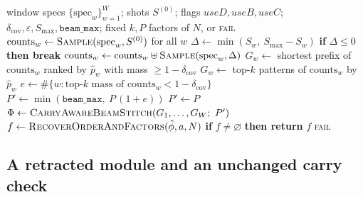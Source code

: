 \documentclass[final,5p,times,longtitle]{elsarticle}
\newenvironment{widealgorithm}{\begin{algorithm*}}{\end{algorithm*}}
\newenvironment{widealgorithm}{\begin{algorithm}[htbp]}{\end{algorithm}}
\newcommand{\Cw}{C_w}
\newcommand{\dcov}{\delta_{\mathrm{cov}}}
\newcommand{\Smax}{S_{\max}}
\newcommand{\beammax}{\texttt{beam\_max}}
\begin{document}
\begin{widealgorithm}
\caption{Confidence-guided adaptive reconstruction. Inputs are the
window specifications, the sampling configuration, the three module
flags, and the parameters of Table~\ref{tab:params}. Lines marked
\textbf{[D]}, \textbf{[B]} and \textbf{[C]} are the only departures from
the published pipeline.}
\label{alg:adaptive}
\small
\begin{algorithmic}[1]
\Require window specs $\{\mathrm{spec}_w\}_{w=1}^{W}$; shots $S^{(0)}$;
flags $\textit{useD},\textit{useB},\textit{useC}$; $\dcov,\varepsilon,\Smax,\beammax$; fixed $k,P$
\Ensure factors of $N$, or \textsc{fail}
\State $\mathrm{counts}_w \gets \textsc{Sample}(\mathrm{spec}_w, S^{(0)})$ for all $w$
\Statex
{}
    \While{$\Cw(\mathrm{counts}_w) < 1-\varepsilon$}
      \State $\Delta \gets \min(S_w,\ \Smax - S_w)$
      \State \textbf{if} $\Delta \le 0$ \textbf{then break}
      \State $\mathrm{counts}_w \gets \mathrm{counts}_w \uplus \textsc{Sample}(\mathrm{spec}_w, \Delta)$
    \EndWhile
  \EndFor
\EndIf
\Statex
{}
    \State $G_w \gets$ shortest prefix of $\mathrm{counts}_w$ ranked by
           $\hat p_w$ with mass $\ge 1-\dcov$ 
  \Else
    \State $G_w \gets$ top-$k$ patterns of $\mathrm{counts}_w$ by $\hat p_w$
  \EndIf
\EndFor
\Statex
{}
  \State $e \gets \#\{w : \text{top-}k\text{ mass of } \mathrm{counts}_w < 1-\dcov\}$
  \State $P' \gets \min(\beammax,\ P\,(1+e))$
\Else
  \State $P' \gets P$
\EndIf
\Statex
\State $\Phi \gets \textsc{CarryAwareBeamStitch}(G_1,\dots,G_W;\ P')$
  \State $f \gets \textsc{RecoverOrderAndFactors}(\hat\phi, a, N)$
  \State \textbf{if} $f \ne \varnothing$ \textbf{then return} $f$
\EndFor
\State \Return \textsc{fail}
\end{algorithmic}
\end{widealgorithm}

\subsection{A retracted module and an unchanged carry check}
\label{sec:retraction}
\end{document}
